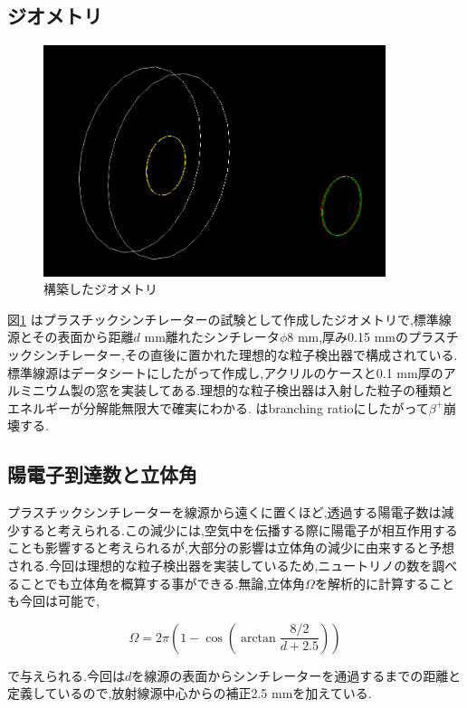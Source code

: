 \subsection{ジオメトリ}

\begin{figure}[htbp]
	\centering
		\includegraphics[width=10cm]{img/test1_geo.png}
	\caption{構築したジオメトリ}
	\label{test1_geo}
\end{figure}

図\ref{test1_geo} はプラスチックシンチレーターの試験として作成したジオメトリで,標準線源とその表面から距離$d$ mm離れたシンチレータ$\phi8$ mm,厚み0.15 mmのプラスチックシンチレーター,その直後に置かれた理想的な粒子検出器で構成されている.標準線源はデータシートにしたがって作成し,アクリルのケースと0.1 mm厚のアルミニウム製の窓を実装してある.理想的な粒子検出器は入射した粒子の種類とエネルギーが分解能無限大で確実にわかる.
はbranching ratioにしたがって$\beta^+$崩壊する.

\subsection{陽電子到達数と立体角}

プラスチックシンチレーターを線源から遠くに置くほど,透過する陽電子数は減少すると考えられる.この減少には,空気中を伝播する際に陽電子が相互作用することも影響すると考えられるが,大部分の影響は立体角の減少に由来すると予想される.今回は理想的な粒子検出器を実装しているため,ニュートリノの数を調べることでも立体角を概算する事ができる.無論,立体角$\Omega$を解析的に計算することも今回は可能で,

\begin{equation}
	\Omega = 2\pi \left( 1-\cos\left(\arctan\frac{8/2}{d+2.5}\right)\right)
\end{equation}

で与えられる.今回は$d$を線源の表面からシンチレーターを通過するまでの距離と定義しているので,放射線源中心からの補正2.5 mmを加えている.

